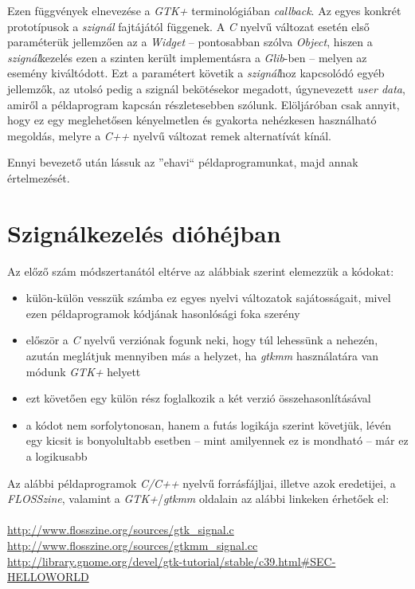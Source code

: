 \documentclass[a4paper,10pt]{article}
\begin{document}
Ezen függvények elnevezése a \textit{GTK+} terminológiában \textit{callback}. Az egyes konkrét prototípusok a \textit{szignál} fajtájától függenek. A \textit{C} nyelvű változat esetén első paraméterük jellemzően az a \textit{Widget} -- pontosabban szólva \textit{Object}, hiszen a \textit{szignál}kezelés ezen a szinten került implementásra a \textit{Glib}-ben -- melyen az esemény kiváltódott. Ezt a paramétert követik a \textit{szignál}hoz kapcsolódó egyéb jellemzők, az utolsó pedig a szignál bekötésekor megadott, úgynevezett \textit{user data}, amiről a példaprogram kapcsán részletesebben szólunk. Elöljáróban csak annyit, hogy ez egy meglehetősen kényelmetlen és gyakorta nehézkesen használható megoldás, melyre a \textit{C++} nyelvű változat remek alternatívát kínál.

Ennyi bevezető után lássuk az ''ehavi`` példaprogramunkat, majd annak értelmezését.

\section{Szignálkezelés dióhéjban}

Az előző szám módszertanától eltérve az alábbiak szerint elemezzük a kódokat:

\begin{itemize}
 \item külön-külön vesszük számba ez egyes nyelvi változatok sajátosságait, mivel ezen példaprogramok kódjának hasonlósági foka szerény
 \item először a \textit{C} nyelvű verziónak fogunk neki, hogy túl lehessünk a nehezén, azután meglátjuk mennyiben más a helyzet, ha \textit{gtkmm} használatára van módunk \textit{GTK+} helyett
 \item ezt követően egy külön rész foglalkozik a két verzió összehasonlításával
 \item a kódot nem sorfolytonosan, hanem a futás logikája szerint követjük, lévén egy kicsit is bonyolultabb esetben -- mint amilyennek ez is mondható -- már ez a logikusabb
\end{itemize}

Az alábbi példaprogramok \textit{C/C++} nyelvű forrásfájljai, illetve azok eredetijei, a \textit{FLOSSzine}, valamint a \textit{GTK+}/\textit{gtkmm} oldalain az alábbi linkeken érhetőek el:
\ \\\\
\url{http://www.flosszine.org/sources/gtk_signal.c}\\
\url{http://www.flosszine.org/sources/gtkmm_signal.cc}\\
\url{http://library.gnome.org/devel/gtk-tutorial/stable/c39.html#SEC-HELLOWORLD}\\
\end{document}
